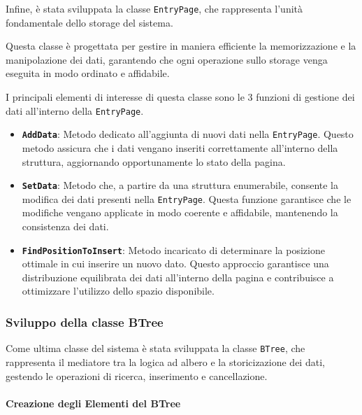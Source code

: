 \documentclass[12pt,a4paper,openright,twoside]{book}
\begin{document}
                Infine, è stata sviluppata la classe \texttt{EntryPage}, che rappresenta l'unità fondamentale dello storage del sistema.

                Questa classe è progettata per gestire in maniera efficiente la memorizzazione e la manipolazione dei dati, garantendo che ogni operazione sullo storage venga eseguita in modo ordinato e affidabile.

                I principali elementi di interesse di questa classe sono le 3 funzioni di gestione dei dati all'interno della \texttt{EntryPage}.

                \begin{itemize}
                    \item \textbf{\texttt{AddData}}: Metodo dedicato all'aggiunta di nuovi dati nella \texttt{EntryPage}.
                    Questo metodo assicura che i dati vengano inseriti correttamente all'interno della struttura, aggiornando opportunamente lo stato della pagina.
                    \item \textbf{\texttt{SetData}}: Metodo che, a partire da una struttura enumerabile, consente la modifica dei dati presenti nella \texttt{EntryPage}.
                    Questa funzione garantisce che le modifiche vengano applicate in modo coerente e affidabile, mantenendo la consistenza dei dati.
                    \item \textbf{\texttt{FindPositionToInsert}}: Metodo incaricato di determinare la posizione ottimale in cui inserire un nuovo dato. Questo approccio garantisce una distribuzione equilibrata dei dati all'interno della pagina e contribuisce a ottimizzare l'utilizzo dello spazio disponibile.
                \end{itemize}

                

                \clearpage

            \subsubsection{Sviluppo della classe BTree}

                Come ultima classe del sistema è stata sviluppata la classe \texttt{BTree}, che rappresenta il mediatore tra la logica ad albero e la storicizazione dei dati, gestendo le operazioni di ricerca, inserimento e cancellazione.

                \paragraph{Creazione degli Elementi del BTree}
\end{document}
